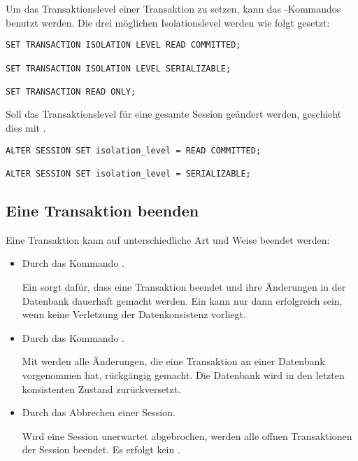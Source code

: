         Um das Transaktionslevel einer Transaktion zu setzen, kann das
        -Kommandos benutzt
        werden. Die drei möglichen Isolationslevel werden wie folgt gesetzt:
        \begin{lstlisting}[caption={Isolationslevel einer Transaktion
        wählen},label=admin401,language=oracle_sql]
SET TRANSACTION ISOLATION LEVEL READ COMMITTED;

SET TRANSACTION ISOLATION LEVEL SERIALIZABLE;

SET TRANSACTION READ ONLY;
        \end{lstlisting}
        Soll das Transaktionslevel für eine gesamte Session geändert werden,
        geschieht dies mit .
\clearpage
        \begin{lstlisting}[caption={Isolationslevel einer Session wählen},label=admin402,language=oracle_sql]
ALTER SESSION SET isolation_level = READ COMMITTED;

ALTER SESSION SET isolation_level = SERIALIZABLE;
        \end{lstlisting}
      \subsection{Eine Transaktion beenden}
        Eine Transaktion kann auf unterschiedliche Art und Weise beendet werden:
        \begin{itemize}
          \item Durch das Kommando .

          Ein  sorgt dafür, dass eine Transaktion beendet und ihre Änderungen in der Datenbank dauerhaft gemacht werden. Ein  kann nur dann erfolgreich sein, wenn keine Verletzung der Datenkonsistenz vorliegt.
          \item Durch das Kommando .

          Mit  werden alle Änderungen, die eine Transaktion an einer Datenbank vorgenommen hat, rückgängig gemacht. Die Datenbank wird in den letzten konsistenten Zustand zurückversetzt.
          \item Durch das Abbrechen einer Session.

          Wird eine Session unerwartet abgebrochen, werden alle offnen Transaktionen der Session beendet. Es erfolgt kein .
        \end{itemize}
